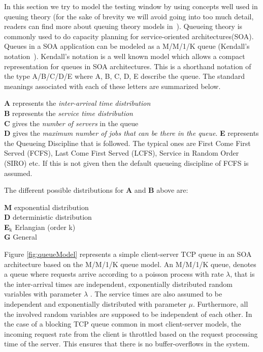 In this section we try to model the testing window by using concepts well used in queuing theory (for the sake of brevity we will avoid going into too much detail, readers can find more about queuing theory models in~\cite{queueBook}).
Queueing theory is commonly used to do capacity planning for service-oriented architectures(SOA).
Queues in a SOA application can be modeled as a M/M/1/K queue (Kendall's notation~\cite{kendall}).
Kendall's notation is a well known model which allows a compact representation for queues in SOA architectures.
This is a shorthand notation of the type A/B/C/D/E where A, B, C, D, E describe the queue.
The standard meanings associated with each of these letters are summarized below.\\

\begin{framed}
	\noindent \textbf{A} represents the \emph{inter-arrival time distribution}\\
	\textbf{B} represents the \emph{service time distribution}\\
	\textbf{C} gives the \emph{number of servers} in the queue\\
	\textbf{D} gives the \emph{maximum number of jobs that can be there in the queue}.
	\textbf{E} represents the Queueing Discipline that is followed. The typical ones are First Come First Served (FCFS), Last Come First Served (LCFS), Service in Random Order (SIRO) etc. If this is not given then the default queueing discipline of FCFS is assumed.
\end{framed}

\noindent The different possible distributions for \textbf{A} and \textbf{B} above are:

\begin{framed}
	\noindent \textbf{M} exponential distribution\\
	\textbf{D} deterministic distribution\\
	\textbf{E$_{\text{k}}$} Erlangian (order k)\\
	\textbf{G} General
\end{framed}



Figure \ref{fig:queueModel} represents a simple client-server TCP queue in an SOA architecture based on the M/M/1/K queue model.
An M/M/1/K queue, denotes a queue where requests arrive according to a poisson process with rate $\lambda$, that is the inter-arrival times are independent, exponentially distributed random variables with parameter $\lambda$ .
The service times are also assumed to be independent and exponentially distributed with parameter $\mu$. 
Furthermore, all the involved random variables are supposed to be independent of each other.
In the case of a blocking TCP queue common in most client-server models, the incoming request rate from the client is throttled based on the request processing time of the server. 
This ensures that there is no buffer-overflows in the system.

